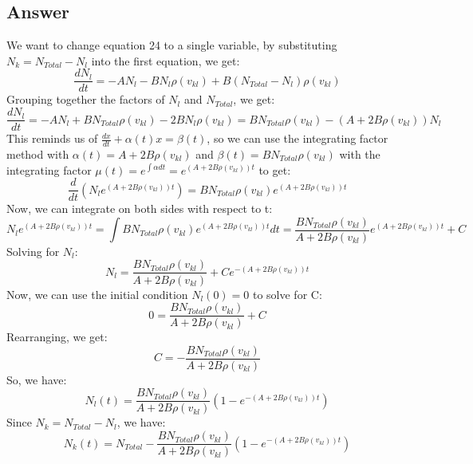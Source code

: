 \documentclass{article}
\begin{document}
\subsection{Answer}
We want to change equation 24 to a single variable, by substituting $N_k = N_{Total} - N_l$ into the first equation, we get:
\begin{equation}
    \frac{dN_{l}}{dt} = -A N_l - B N_l \rho (v_{kl})+B(N_{Total} - N_l) \rho (v_{kl})
\end{equation}
 Grouping together the factors of $N_l$ and $N_{Total}$, we get:
    \begin{equation}
        \frac{dN_{l}}{dt} = -A N_l + B N_{Total} \rho (v_{kl}) - 2BN_l \rho (v_{kl}) = B N_{Total} \rho (v_{kl}) - (A+2B\rho (v_{kl}))N_l
    \end{equation}
This reminds us of $\frac{dx}{dt} + \alpha(t)  x = \beta(t) $, so we can use the integrating factor method with $\alpha(t) = A+2B\rho (v_{kl})$ and $\beta(t) = B N_{Total} \rho (v_{kl})$ with the integrating factor $\mu (t) = e^{\int \alpha dt} = e^{(A+2B\rho (v_{kl}))t}$ to get:
\begin{equation}
    \frac{d}{dt}(N_l e^{(A+2B\rho (v_{kl}))t}) = B N_{Total} \rho (v_{kl})e^{(A+2B\rho (v_{kl}))t}
\end{equation}
Now, we can integrate on both sides with respect to t:
\begin{equation}
    N_l e^{(A+2B\rho (v_{kl}))t} = \int B N_{Total} \rho (v_{kl})e^{(A+2B\rho (v_{kl}))t} dt = \frac{B N_{Total} \rho (v_{kl})}{A+2B\rho (v_{kl})}e^{(A+2B\rho (v_{kl}))t} + C
\end{equation}
Solving for $N_l$:
\begin{equation}
    N_l = \frac{B N_{Total} \rho (v_{kl})}{A+2B\rho (v_{kl})} + Ce^{-(A+2B\rho (v_{kl}))t}
\end{equation}
Now, we can use the initial condition $N_l(0) = 0$ to solve for C:
\begin{equation}
    0 = \frac{B N_{Total} \rho (v_{kl})}{A+2B\rho (v_{kl})} + C
\end{equation}
Rearranging, we get:
\begin{equation}
    C = -\frac{B N_{Total} \rho (v_{kl})}{A+2B\rho (v_{kl})}
\end{equation}
So, we have:
\begin{equation}
    N_l(t) = \frac{B N_{Total} \rho (v_{kl})}{A+2B\rho (v_{kl})}\left(1-e^{-(A+2B\rho (v_{kl}))t}\right)
\end{equation}
Since $N_k = N_{Total} - N_l$, we have:
\begin{equation}
    N_k(t) = N_{Total} - \frac{B N_{Total} \rho (v_{kl})}{A+2B\rho (v_{kl})}\left(1-e^{-(A+2B\rho (v_{kl}))t}\right)
\end{equation}
\end{document}

